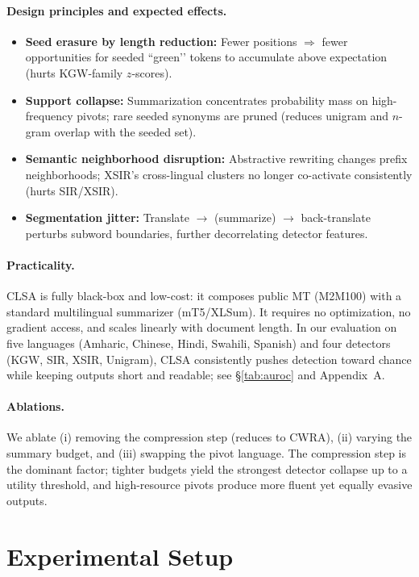 \documentclass{article}
\begin{document}
\paragraph{Design principles and expected effects.}
\begin{itemize}
    \item \textbf{Seed erasure by length reduction:} Fewer positions $\Rightarrow$ fewer opportunities for seeded “green’’ tokens to accumulate above expectation (hurts KGW-family $z$-scores).
    \item \textbf{Support collapse:} Summarization concentrates probability mass on high-frequency pivots; rare seeded synonyms are pruned (reduces unigram and $n$-gram overlap with the seeded set).
    \item \textbf{Semantic neighborhood disruption:} Abstractive rewriting changes prefix neighborhoods; XSIR’s cross-lingual clusters no longer co-activate consistently (hurts SIR/XSIR).
    \item \textbf{Segmentation jitter:} Translate $\rightarrow$ (summarize) $\rightarrow$ back-translate perturbs subword boundaries, further decorrelating detector features.
\end{itemize}

\paragraph{Practicality.}
CLSA is fully black-box and low-cost: it composes public MT (M2M100) with a standard multilingual summarizer (mT5/XLSum). It requires no optimization, no gradient access, and scales linearly with document length. In our evaluation on five languages (Amharic, Chinese, Hindi, Swahili, Spanish) and four detectors (KGW, SIR, XSIR, Unigram), CLSA consistently pushes detection toward chance while keeping outputs short and readable; see \S\ref{tab:auroc} and Appendix~A.

\paragraph{Ablations.}
We ablate (i) removing the compression step (reduces to CWRA), (ii) varying the summary budget, and (iii) swapping the pivot language. The compression step is the dominant factor; tighter budgets yield the strongest detector collapse up to a utility threshold, and high-resource pivots produce more fluent yet equally evasive outputs.

\section{Experimental Setup}
\end{document}
